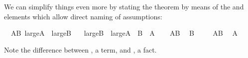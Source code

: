\begin{isabellebody}
\begin{isamarkuptext}
We can simplify things even more by stating the theorem by means of the
 and  elements which allow direct
naming of assumptions:%
\end{isamarkuptext}%
\isamarkuptrue%
\isamarkupfalse%
\ \ AB{\isacharcolon}\ {\isachardoublequoteopen}large{\isacharunderscore}A\ {\isasymand}\ large{\isacharunderscore}B{\isachardoublequoteclose}\isanewline
\ \ \ {\isachardoublequoteopen}large{\isacharunderscore}B\ {\isasymand}\ large{\isacharunderscore}A{\isachardoublequoteclose}\ {\isacharparenleft}\ {\isachardoublequoteopen}{\isacharquery}B\ {\isasymand}\ {\isacharquery}A{\isachardoublequoteclose}{\isacharparenright}\isanewline
%
\isadelimproof
%
\endisadelimproof
%
\isatagproof
{}\isamarkupfalse%
\isanewline
\ \ \isamarkupfalse%
\ AB\ \isamarkupfalse%
\ {\isachardoublequoteopen}{\isacharquery}B{\isachardoublequoteclose}\ \isacommand{{\isachardot}{\isachardot}}\isamarkupfalse%
\isanewline
{}\isamarkupfalse%
\isanewline
\ \ \isamarkupfalse%
\ AB\ \isamarkupfalse%
\ {\isachardoublequoteopen}{\isacharquery}A{\isachardoublequoteclose}\ \isacommand{{\isachardot}{\isachardot}}\isamarkupfalse%
\isanewline
{}\isamarkupfalse%
%
\endisatagproof
{\isafoldproof}%
%
\isadelimproof
%
\endisadelimproof
%
\begin{isamarkuptext}%
\noindent Note the difference between , a term, and
, a fact.


\end{isamarkuptext}
\end{isabellebody}
